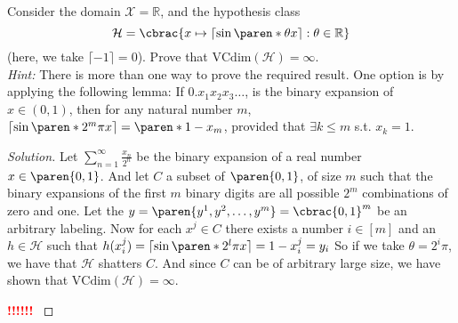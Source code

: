 \documentclass[10pt, a4paper, twoside]{amsart}
\theoremstyle{plain}
\newcommand{\R}{\ensuremath{\mathbb{R}}}
\DeclarePairedDelimiter\cbrac\{\}
\DeclarePairedDelimiter\paren()
\newcommand{\cH}{\ensuremath{\mathcal{H}}}
\newcommand{\cX}{\ensuremath{\mathcal{X}}}
\newenvironment{solution}
               {\let\oldqedsymbol=\qedsymbol
                \renewcommand{\qedsymbol}{$\blacktriangleleft$}
                \begin{proof}[Solution]}
               {\end{proof}
                \renewcommand{\qedsymbol}{\oldqedsymbol}}
\newcommand{\TODO}{\textcolor{red}{\textbf{!!!!!! }}}
\begin{document}
Consider the domain $\cX = \R$, and the hypothesis class
\begin{equation*}
  \cH = \cbrac{x \mapsto \left\lceil \sin\paren*{\theta x} \right\rceil : \theta \in \R }
\end{equation*}
(here, we take $\lceil -1 \rceil = 0$). Prove that $\text{VCdim}(\cH) = \infty$.\\
\textit{Hint:} There is more than one way to prove the required result. One option is by applying the following lemma: If $0 . x_1 x_2 x_3 \ldots$, is the binary expansion of $x \in (0,1)$, then for any natural number $m$, $\lceil \sin \paren*{2^m \pi x} \rceil = \paren*{1-x_m}$, provided that $\exists k \leq m$ s.t. $x_k =1$.
\begin{solution}
Let $\sum_{n=1}^{\infty} \frac{x_n}{2^n}$ be the binary expansion of a real number $x \in \paren{0,1}$. And let $C$ a subset of $\paren{0,1}$, of size $m$ such that the binary expansions of the first $m$ binary digits are all possible $2^m$ combinations of zero and one. Let the $y = \paren{y^1,y^2, \ldots, y^m} =  \cbrac{0,1}^m$ be an arbitrary labeling. Now for each $x^j \in C$ there exists a number $i \in [m]$ and an $h \in \cH$ such that $h(x_i^j) = \lceil \sin \paren*{2^l \pi x}\rceil = 1-x_i^j = y_i $ So if we take $\theta = 2^i \pi$, we have that $\cH$ shatters $C$. And since $C$ can be of arbitrary large size, we have shown that $\text{VCdim}(\cH) = \infty$.

\TODO
\end{solution}
\end{document}
